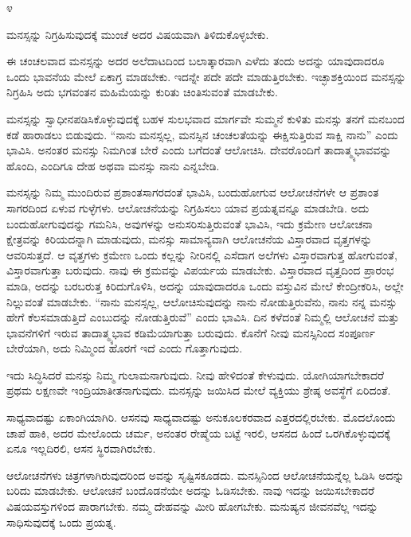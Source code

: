 \begin{center}
೪
\end{center}

ಮನಸ್ಸನ್ನು ನಿಗ್ರಹಿಸುವುದಕ್ಕೆ ಮುಂಚೆ ಅದರ ವಿಷಯವಾಗಿ ತಿಳಿದುಕೊಳ್ಳಬೇಕು.

\vskip 3pt

ಈ ಚಂಚಲವಾದ ಮನಸ್ಸನ್ನು ಅದರ ಅಲೆದಾಟದಿಂದ ಬಲಾತ್ಕಾರವಾಗಿ ಎಳೆದು ತಂದು ಅದನ್ನು ಯಾವುದಾದರೂ ಒಂದು ಭಾವನೆಯ ಮೇಲೆ ಏಕಾಗ್ರ ಮಾಡಬೇಕು. ಇದನ್ನೇ ಪದೇ ಪದೇ ಮಾಡುತ್ತಿರಬೇಕು. ಇಚ್ಛಾಶಕ್ತಿಯಿಂದ ಮನಸ್ಸನ್ನು ನಿಗ್ರಹಿಸಿ ಅದು ಭಗವಂತನ ಮಹಿಮೆಯನ್ನು ಕುರಿತು ಚಿಂತಿಸುವಂತೆ ಮಾಡಬೇಕು.

\vskip 3pt

ಮನಸ್ಸನ್ನು ಸ್ವಾಧೀನಪಡಿಸಿಕೊಳ್ಳುವುದಕ್ಕೆ ಬಹಳ ಸುಲಭವಾದ ಮಾರ್ಗವೇ ಸುಮ್ಮನೆ ಕುಳಿತು ಮನಸ್ಸು ತನಗೆ ಮನಬಂದ ಕಡೆ ಹಾರಾಡಲು ಬಿಡುವುದು. “ನಾನು ಮನಸ್ಸಲ್ಲ, ಮನಸ್ಸಿನ ಚಂಚಲತೆಯನ್ನು ಈಕ್ಷಿಸುತ್ತಿರುವ ಸಾಕ್ಷಿ ನಾನು'' ಎಂದು ಭಾವಿಸಿ. ಅನಂತರ ಮನಸ್ಸು ನಿಮಗಿಂತ ಬೇರೆ ಎಂದು ಬಗೆದಂತೆ ಆಲೋಚಿಸಿ. ದೇವರೊಂದಿಗೆ ತಾದಾತ್ಮ್ಯಭಾವವನ್ನು ಹೊಂದಿ, ಎಂದಿಗೂ ದೇಹ ಅಥವಾ ಮನಸ್ಸು ನಾನು ಎನ್ನಬೇಡಿ.

\vskip 3pt

ಮನಸ್ಸನ್ನು ನಿಮ್ಮ ಮುಂದಿರುವ ಪ್ರಶಾಂತಸಾಗರದಂತೆ ಭಾವಿಸಿ, ಬಂದುಹೋಗುವ ಆಲೋಚನೆಗಳೇ ಆ ಪ್ರಶಾಂತ ಸಾಗರದಿಂದ ಏಳುವ ಗುಳ್ಳೆಗಳು. ಆಲೋಚನೆಯನ್ನು ನಿಗ್ರಹಿಸಲು ಯಾವ ಪ್ರಯತ್ನವನ್ನೂ ಮಾಡಬೇಡಿ. ಅದು ಬಂದುಹೋಗುವುದನ್ನು ಗಮನಿಸಿ, ಅವುಗಳನ್ನು ಅನುಸರಿಸುತ್ತಿರುವಂತೆ ಭಾವಿಸಿ, ಇದು ಕ್ರಮೇಣ ಆಲೋಚನಾ ಕ್ಷೇತ್ರವನ್ನು ಕಿರಿಯದನ್ನಾಗಿ ಮಾಡುವುದು, ಮನಸ್ಸು ಸಾಮಾನ್ಯವಾಗಿ ಆಲೋಚನೆಯ ವಿಸ್ತಾರವಾದ ವೃತ್ತಗಳನ್ನು ಆವರಿಸುತ್ತದೆ. ಆ ವೃತ್ತಗಳು ಕ್ರಮೇಣ ಒಂದು ಕಲ್ಲನ್ನು ನೀರಿನಲ್ಲಿ ಎಸೆದಾಗ ಅಲೆಗಳು ವಿಸ್ತಾರವಾಗುತ್ತ ಹೋಗುವಂತೆ, ವಿಸ್ತಾರವಾಗುತ್ತಾ ಬರುವುದು. ನಾವು ಈ ಕ್ರಮವನ್ನು ವಿಪರ್ಯಯ ಮಾಡಬೇಕು. ವಿಸ್ತಾರವಾದ ವೃತ್ತದಿಂದ ಪ್ರಾರಂಭ ಮಾಡಿ, ಅದನ್ನು ಬರಬರುತ್ತ ಕಿರಿದುಗೊಳಿಸಿ, ಅದನ್ನು ಯಾವುದಾದರೂ ಒಂದು ವಸ್ತುವಿನ ಮೇಲೆ ಕೇಂದ್ರೀಕರಿಸಿ, ಅಲ್ಲೇ ನಿಲ್ಲುವಂತೆ ಮಾಡಬೇಕು. “ನಾನು ಮನಸ್ಸಲ್ಲ, ಆಲೋಚಿಸುವುದನ್ನು ನಾನು ನೋಡುತ್ತಿರುವೆನು, ನಾನು ನನ್ನ ಮನಸ್ಸು ಹೇಗೆ ಕೆಲಸಮಾಡುತ್ತಿದೆ ಎಂಬುದನ್ನು ನೋಡುತ್ತಿರುವೆ'' ಎಂದು ಭಾವಿಸಿ. ದಿನ ಕಳೆದಂತೆ ನಿಮ್ಮಲ್ಲಿ ಆಲೋಚನೆ ಮತ್ತು ಭಾವನೆಗಳಿಗೆ ಇರುವ ತಾದಾತ್ಮ್ಯಭಾವ ಕಡಿಮೆಯಾಗುತ್ತಾ ಬರುವುದು. ಕೊನೆಗೆ ನೀವು ಮನಸ್ಸಿನಿಂದ ಸಂಪೂರ್ಣ ಬೇರೆಯಾಗಿ, ಅದು ನಿಮ್ಮಿಂದ ಹೊರಗೆ ಇದೆ ಎಂದು ಗೊತ್ತಾಗುವುದು.

\vskip 3pt

ಇದು ಸಿದ್ಧಿಸಿದರೆ ಮನಸ್ಸು ನಿಮ್ಮ ಗುಲಾಮನಾಗುವುದು. ನೀವು ಹೇಳಿದಂತೆ ಕೇಳುವುದು. ಯೋಗಿಯಾಗಬೇಕಾದರೆ ಪ್ರಥಮ ಲಕ್ಷಣವೇ ಇಂದ್ರಿಯಾತೀತನಾಗುವುದು. ಮನಸ್ಸನ್ನು ಜಯಿಸಿದ ಮೇಲೆ ವ್ಯಕ್ತಿಯು ಶ್ರೇಷ್ಠ ಅವಸ್ಥೆಗೆ ಏರಿದಂತೆ.

\vskip 3pt

ಸಾಧ್ಯವಾದಷ್ಟು ಏಕಾಂಗಿಯಾಗಿರಿ. ಆಸನವು ಸಾಧ್ಯವಾದಷ್ಟು ಅನುಕೂಲಕರವಾದ ಎತ್ತರದಲ್ಲಿರಬೇಕು. ಮೊದಲೊಂದು ಚಾಪೆ ಹಾಕಿ, ಅದರ ಮೇಲೊಂದು ಚರ್ಮ, ಅನಂತರ ರೇಷ್ಮೆಯ ಬಟ್ಟೆ ಇರಲಿ, ಆಸನದ ಹಿಂದೆ ಒರಗಿಕೊಳ್ಳುವುದಕ್ಕೆ ಏನೂ ಇಲ್ಲದಿರಲಿ, ಆಸನ ಸ್ಥಿರವಾಗಿರಬೇಕು.

\vskip 3pt

ಆಲೋಚನೆಗಳು ಚಿತ್ರಗಳಾಗಿರುವುದರಿಂದ ಅವನ್ನು ಸೃಷ್ಟಿಸಕೂಡದು. ಮನಸ್ಸಿನಿಂದ ಆಲೋಚನೆಯನ್ನೆಲ್ಲ ಓಡಿಸಿ ಅದನ್ನು ಬರಿದು ಮಾಡಬೇಕು. ಆಲೋಚನೆ ಬಂದೊಡನೆಯೇ ಅದನ್ನು ಓಡಿಸಬೇಕು. ನಾವು ಇದನ್ನು ಜಯಿಸಬೇಕಾದರೆ ವಿಷಯವಸ್ತುಗಳಿಂದ ಪಾರಾಗಬೇಕು. ನಮ್ಮ ದೇಹವನ್ನು ಮೀರಿ ಹೋಗಬೇಕು. ಮನುಷ್ಯನ ಜೀವನವೆಲ್ಲ ಇದನ್ನು ಸಾಧಿಸುವುದಕ್ಕೆ ಒಂದು ಪ್ರಯತ್ನ.

